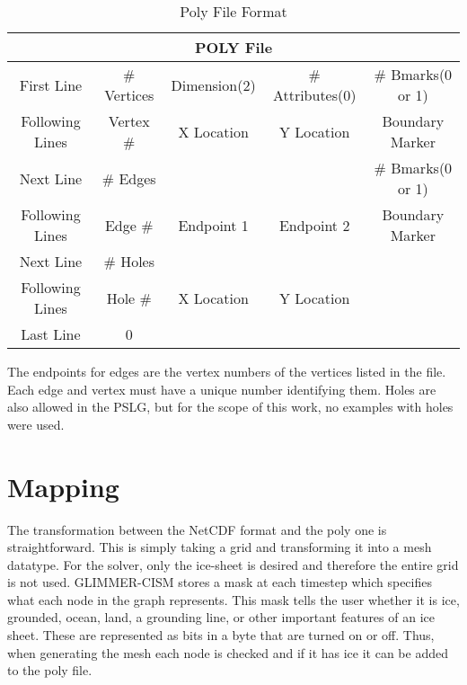 \begin{table}[ht]
\caption{Poly File Format}
\centering
\begin{center}
    \begin{tabular}{ | c | c | c | c | c |}
    \hline
    \multicolumn{5}{|c|}{POLY File}\\
    \hline
    First Line & \# Vertices & Dimension(2) & \# Attributes(0) & \# Bmarks(0 or 1)  \\ \hline
    Following Lines & Vertex \# & X Location & Y Location & Boundary Marker \\ \hline
    Next Line & \# Edges & & & \# Bmarks(0 or 1) \\ \hline
    Following Lines & Edge \# & Endpoint 1 & Endpoint 2 & Boundary Marker \\ \hline
    Next Line & \# Holes & & & \\ \hline
    Following Lines & Hole \# & X Location & Y Location & \\ \hline
    Last Line & 0 & & & \\ \hline
    \end{tabular}
\end{center}
\end{table}

\citep{Triangle:website}

The endpoints for edges are the vertex numbers of the vertices listed in the file.  Each edge and vertex must have a unique number identifying them.  Holes are also allowed in the PSLG, but for the scope of this work, no examples with holes were used.

\section{Mapping}\label{sec:chp3map}


The transformation between the NetCDF format and the poly one is straightforward.  This is simply taking a grid and transforming it into a mesh datatype.  For the solver, only the ice-sheet is desired and therefore the entire grid is not used.  GLIMMER-CISM stores a mask at each timestep which specifies what each node in the graph represents.  This mask tells the user whether it is ice, grounded, ocean, land, a grounding line, or other important features of an ice sheet.  These are represented as bits in a byte that are turned on or off.  Thus, when generating the mesh each node is checked and if it has ice it can be added to the poly file.  

